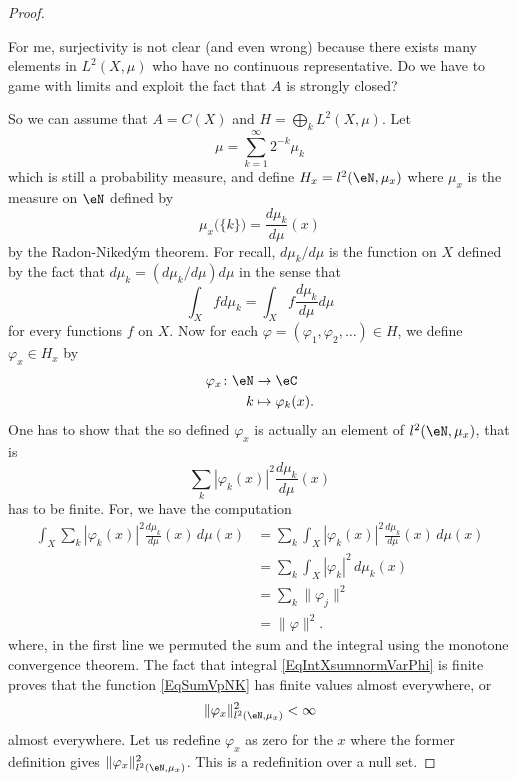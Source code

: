 \begin{proof}
\begin{probleme}
		For me, surjectivity is not clear (and even wrong) because there exists many elements in $L^2(X,\mu)$ who have no continuous representative. Do we have to game with limits and exploit the fact that $A$ is strongly closed?

		\end{probleme}
	So we can assume that $A=C(X)$ and $H=\bigoplus_kL^2(X,\mu)$. Let
	\begin{equation}
		\mu=\sum_{k=1}^{\infty}2^{-k}\mu_k
	\end{equation}
	which is still a probability measure, and define $H_x=l^2(\eN,\mu_x)$ where $\mu_x$ is the measure on $\eN$ defined by
	\begin{equation}
		\mu_x\big( \{ k \} \big)=\frac{ d\mu_k }{ d\mu }(x)
	\end{equation}
	by the Radon-Niked\'ym theorem. For recall, $d\mu_k/d\mu$ is the function on $X$ defined by the fact that $d\mu_k=(d\mu_k/d\mu)d\mu$ in the sense that
	\begin{equation}
		\int_Xfd\mu_k=\int_Xf\frac{ d\mu_k }{ d\mu }d\mu
	\end{equation}
	for every functions $f$ on $X$. Now for each $\varphi=(\varphi_1,\varphi_2,\ldots)\in H$, we define $\varphi_x\in H_x$ by
	\begin{equation}
	\begin{aligned}
	 \varphi_x\colon \eN&\to \eC \\
	   k&\mapsto \varphi_k(x).
	\end{aligned}
	\end{equation}
	One has to show that the so defined $\varphi_x$ is actually an element of $l^2(\eN,\mu_x)$, that is
	\begin{equation}		\label{EqSumVpNK}
		\sum_k| \varphi_k(x) |^2\frac{ d\mu_k }{ d\mu }(x)
	\end{equation}
	has to be finite. For, we have the computation
	\begin{equation}		\label{EqIntXsumnormVarPhi}
	\begin{split}
		\int_X\sum_k| \varphi_k(x) |^2\frac{ d\mu_k }{ d\mu }(x)\,d\mu(x)
			&=\sum_k\int_X| \varphi_k(x) |^2\frac{ d\mu_k }{ d\mu }(x)\,d\mu(x)\\
			& = \sum_k\int_X| \varphi_k |^2\,d\mu_k(x)\\
			& = \sum_k\| \varphi_j \|^2\\
			& = \| \varphi \|^2.
	\end{split}
	\end{equation}
	where, in the first line we permuted the sum and the integral using the monotone convergence theorem. The fact that integral \eqref{EqIntXsumnormVarPhi} is finite proves that the function \eqref{EqSumVpNK} has finite values almost everywhere, or
	\begin{equation}
		\| \varphi_x \|^2_{l^2(\eN,\mu_x)}<\infty
	\end{equation}
	almost everywhere. Let us redefine $\varphi_x$ as zero for the $x$ where the former definition gives $\| \varphi_x \|^2_{l^2(\eN,\mu_x)}$. This is a redefinition over a null set.


\end{proof}
